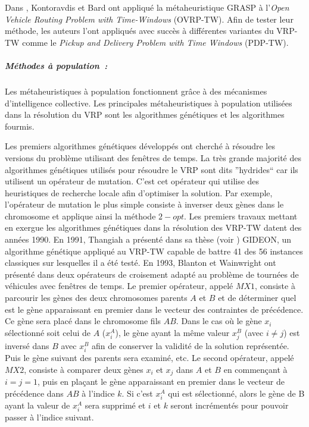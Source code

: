 Dans \cite{Kontoravdis1995}, Kontoravdis et Bard ont appliqué la métaheuristique GRASP à l'\textit{Open Vehicle Routing Problem with Time-Windows} (OVRP-TW). Afin de tester leur méthode, les auteurs l'ont appliqués avec succès à différentes variantes du VRP-TW comme le \textit{Pickup and Delivery Problem with Time Windows} (PDP-TW).

\subparagraph{Méthodes à population~:\\}

Les métaheuristiques à population fonctionnent grâce à des mécanismes d'intelligence collective. Les principales métaheuristiques à population utilisées dans la résolution du VRP sont les algorithmes génétiques et les algorithmes fourmis.

Les premiers algorithmes génétiques développés ont cherché à résoudre les versions du problème utilisant des fenêtres de temps. La très grande majorité des algorithmes génétiques utilisés pour résoudre le VRP sont dits ''hydrides`` car ils utilisent un opérateur de mutation. C'est cet opérateur qui utilise des heuristiques de recherche locale afin d'optimiser la solution. Par exemple, l'opérateur de mutation le plus simple consiste à inverser deux gènes dans le chromosome et applique ainsi la méthode $2-opt$.
Les premiers travaux mettant en exergue les algorithmes génétiques dans la résolution des VRP-TW datent des années 1990. En 1991, Thangiah a présenté dans sa thèse (voir \cite{Thangiah1991}) GIDEON, un algorithme génétique appliqué au VRP-TW capable de battre 41 des 56 instances classiques sur lesquelles il a été testé. En 1993, Blanton et Wainwright ont présenté dans \cite{Blanton1993} deux opérateurs de croisement adapté au problème de tournées de véhicules avec fenêtres de temps. Le premier opérateur, appelé $MX1$, consiste à parcourir les gènes des deux chromosomes parents $A$ et $B$ et de déterminer quel est le gène apparaissant en premier dans le vecteur des contraintes de précédence. Ce gène sera placé dans le chromosome fils $AB$. Dans le cas où le gène $x_i$ sélectionné soit celui de $A$ ($x_i^A$), le gène ayant la même valeur $x_j^B$ (avec $i \neq j$) est inversé dans $B$ avec $x_i^B$ afin de conserver la validité de la solution représentée. Puis le gène suivant des parents sera examiné, etc. Le 
second opérateur, appelé $MX2$, consiste à comparer deux gènes $x_i$ et $x_j$ dans $A$ et $B$ en commençant à $i=j=1$, puis en plaçant le gène apparaissant en premier dans le vecteur de précédence dans $AB$ à l'indice $k$. Si c'est $x_i^A$ qui est sélectionné, alors le gène de B ayant la valeur de $x_i^A$ sera supprimé et $i$ et $k$ seront incrémentés pour pouvoir passer à l'indice suivant.
